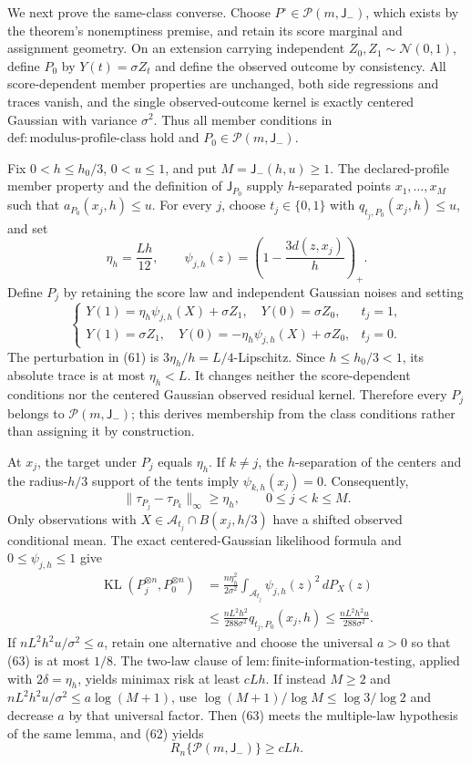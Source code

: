 We next prove the same-class converse. Choose \(P^\circ\in\mathcal P(m,\mathsf J_{-})\), which exists by the theorem's nonemptiness premise, and retain its score marginal and assignment geometry. On an extension carrying independent \(Z_0,Z_1\sim\mathcal N(0,1)\), define \(P_0\) by \(Y(t)=\sigma Z_t\) and define the observed outcome by consistency. All score-dependent member properties are unchanged, both side regressions and traces vanish, and the single observed-outcome kernel is exactly centered Gaussian with variance \(\sigma^2\). Thus all member conditions in \(\mathrm{def:modulus\text{-}profile\text{-}class}\) hold and \(P_0\in\mathcal P(m,\mathsf J_{-})\).

Fix \(0<h\le h_0/3\), \(0<u\le1\), and put \(M=\mathsf J_{-}(h,u)\ge1\). The declared-profile member property and the definition of \(\mathsf J_{P_0}\) supply \(h\)-separated points \(x_1,\ldots,x_M\) such that \(a_{P_0}(x_j,h)\le u\). For every \(j\), choose \(t_j\in\{0,1\}\) with \(q_{t_j,P_0}(x_j,h)\le u\), and set
\[
 \eta_h=\frac{Lh}{12},
 \qquad
 \psi_{j,h}(z)=\left(1-\frac{3d(z,x_j)}h\right)_+. \tag{60}
\]
Define \(P_j\) by retaining the score law and independent Gaussian noises and setting
\[
 \begin{cases}
 Y(1)=\eta_h\psi_{j,h}(X)+\sigma Z_1,\quad Y(0)=\sigma Z_0,&t_j=1,\\
 Y(1)=\sigma Z_1,\quad Y(0)=-\eta_h\psi_{j,h}(X)+\sigma Z_0,&t_j=0.
 \end{cases} \tag{61}
\]
The perturbation in (61) is \(3\eta_h/h=L/4\)-Lipschitz. Since \(h\le h_0/3<1\), its absolute trace is at most \(\eta_h<L\). It changes neither the score-dependent conditions nor the centered Gaussian observed residual kernel. Therefore every \(P_j\) belongs to \(\mathcal P(m,\mathsf J_{-})\); this derives membership from the class conditions rather than assigning it by construction.

At \(x_j\), the target under \(P_j\) equals \(\eta_h\). If \(k\ne j\), the \(h\)-separation of the centers and the radius-\(h/3\) support of the tents imply \(\psi_{k,h}(x_j)=0\). Consequently,
\[
 \|\tau_{P_j}-\tau_{P_k}\|_\infty\ge\eta_h,
 \qquad 0\le j<k\le M. \tag{62}
\]
Only observations with \(X\in\mathcal A_{t_j}\cap B(x_j,h/3)\) have a shifted observed conditional mean. The exact centered-Gaussian likelihood formula and \(0\le\psi_{j,h}\le1\) give
\[
 \begin{aligned}
 \operatorname{KL}(P_j^{\otimes n},P_0^{\otimes n})
 &=\frac{n\eta_h^2}{2\sigma^2}
   \int_{\mathcal A_{t_j}}\psi_{j,h}(z)^2\,dP_X(z)\\
 &\le\frac{nL^2h^2}{288\sigma^2}
   q_{t_j,P_0}(x_j,h)
 \le\frac{nL^2h^2u}{288\sigma^2}.
 \end{aligned} \tag{63}
\]
If \(nL^2h^2u/\sigma^2\le a\), retain one alternative and choose the universal \(a>0\) so that (63) is at most \(1/8\). The two-law clause of \(\mathrm{lem:finite\text{-}information\text{-}testing}\), applied with \(2\delta=\eta_h\), yields minimax risk at least \(cLh\). If instead \(M\ge2\) and \(nL^2h^2u/\sigma^2\le a\log(M+1)\), use \(\log(M+1)/\log M\le\log3/\log2\) and decrease \(a\) by that universal factor. Then (63) meets the multiple-law hypothesis of the same lemma, and (62) yields
\[
 R_n\{\mathcal P(m,\mathsf J_{-})\}\ge cLh. \tag{64}
\]

